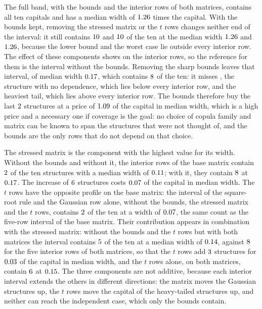 The full band, with the bounds and the interior rows of both matrices, contains all ten capitals and has a median width of
$1.26$ times the capital. With the bounds kept, removing the stressed matrix or the $t$ rows changes neither end of the
interval: it still contains $10$ and $10$ of the ten at the median width $1.26$ and
$1.26$, because the lower bound and the worst case lie outside every interior row. The effect of these components shows
on the interior rows, so the reference for them is the interval without the bounds. Removing the sharp bounds leaves that interval, of
median width $0.17$, which contains $8$ of the ten: it misses \bdMissedNoBounds{}, the structure with no dependence, which lies below every interior row, and
the heaviest tail, which lies above every interior row. The bounds therefore buy the last $2$ structures at a price of $1.09$ of the capital in median width, which is a high
price and a necessary one if coverage is the goal: no
choice of copula family and matrix can be known to span the structures that were not thought of, and the bounds are the only
rows that do not depend on that choice.

The stressed matrix is the component with the highest value for its width. Without the bounds and without it, the interior rows of
the base matrix contain $2$ of the ten structures with a median width of $0.11$; with it, they
contain $8$ at $0.17$. The increase of $6$ structures costs $0.07$ of the capital in median width. The $t$ rows have
the opposite profile on the base matrix: the interval of the square-root rule and the Gaussian row alone, without the bounds, the stressed matrix and
the $t$ rows, contains $2$ of the ten at a width of $0.07$, the same count as the five-row interval of the base matrix. Their
contribution appears in combination with the stressed matrix: without the bounds and the $t$ rows but with both matrices the interval contains
$5$ of the ten at a median width of $0.14$, against $8$ for the five interior rows of
both matrices, so that the $t$ rows add $3$ structures for $0.03$ of the capital in median width, and the $t$ rows alone, on both matrices, contain $6$ at $0.15$. The three components are
not additive, because each interior interval extends the others in different directions: the matrix moves the Gaussian
structures up, the $t$ rows move the capital of the heavy-tailed structures up, and neither can reach the independent case, which
only the bounds contain.

